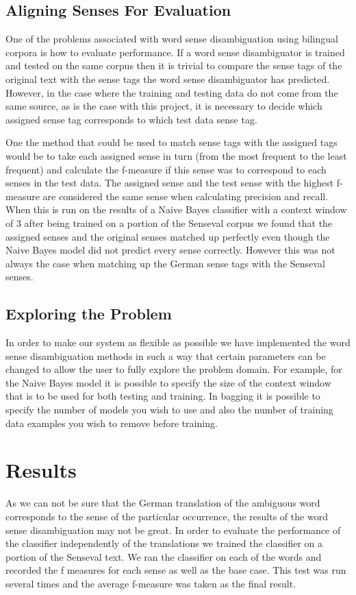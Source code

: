 \documentclass[a4wide,10pt]{article}
\begin{document}
\subsection{Aligning Senses For Evaluation}
One of the problems associated with word sense disambiguation using bilingual
corpora is how to evaluate performance.
If a word sense disambiguator is trained and tested on the same corpus
then it is trivial to compare the sense tags of the original text with
the sense tags the word sense disambiguator has predicted.  However, in the
case where the training and testing data do not come from the same source,
as is the case with this project, it is necessary to decide which assigned
sense tag corresponds to which test data sense tag.

One the method that could be used to match sense tags with the assigned tags
would be to take each assigned sense in turn (from the most frequent
to the least frequent) and calculate the
f-measure if this sense was to correspond to each senses in the test data.
The assigned sense and the test sense with the highest f-measure are considered
the same sense when calculating precision and recall.
When this is run on the results of a Naive Bayes classifier with a context
window of 3 after being trained on a portion of the Senseval corpus we found
that the assigned senses and the original senses matched up perfectly even
though the Naive Bayes model did not predict every sense correctly.
However this was not always the case when matching up the German sense tags with
the Senseval senses.

\subsection{Exploring the Problem}
In order to make our system as flexible as possible we have implemented the
word sense disambiguation methods in such a way that certain parameters can
be changed to allow the user to fully explore the problem domain.
For example, for the Naive Bayes model it is possible to specify the
size of the context window that is to be used for both testing and training.
In bagging it is possible to specify the number of models you wish to use
and also the number of training data examples you wish to remove before
training.

\section{Results}
\label{results}
As we can not be sure that the German translation of the ambiguous word
corresponds to the sense of the particular occurrence, the results of the
word sense disambiguation may not be great.  In order to evaluate the
performance of the classifier independently of the translations
we trained the classifier on a portion of the Senseval text.
We ran the classifier on each of the words and recorded the f measures
for each sense as well as the base case.  This test was run several times
and the average f-measure was taken as the final result.
\end{document}
